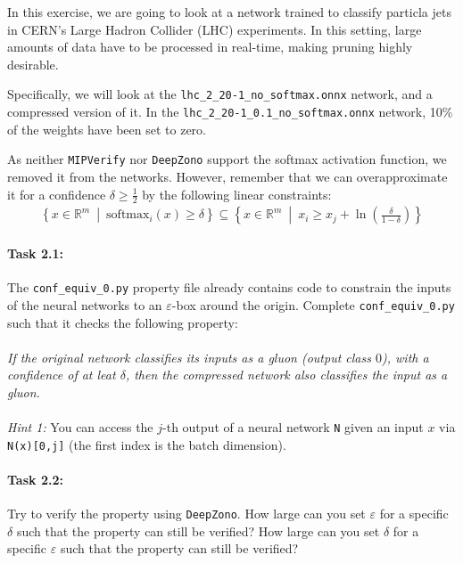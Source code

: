 \documentclass[11pt,fleqn]{article}
\begin{document}
In this exercise, we are going to look at a network trained to classify particla jets in CERN's 
Large Hadron Collider (LHC) experiments.
In this setting, large amounts of data have to be processed in real-time, making pruning highly desirable.

Specifically, we will look at the \texttt{lhc\_2\_20-1\_no\_softmax.onnx} network, and a compressed version of it.
In the \texttt{lhc\_2\_20-1\_0.1\_no\_softmax.onnx} network, 10\% of the weights have been set to zero.

As neither \texttt{MIPVerify} nor \texttt{DeepZono} support the softmax activation function, we removed it from the networks.
However, remember that we can overapproximate it for a confidence $\delta \geq \frac{1}{2}$ by the following linear constraints: 
\begin{align*}
    \left\{
        x \in \mathbb{R}^m~\middle|~
        \mathrm{softmax}_i\left(x\right) \geq \delta
    \right\}
\subseteq
\left\{
x \in \mathbb{R}^m~\middle|~
x_i \geq x_j + \ln\left(\frac{\delta}{1-\delta}\right)
\right\}
\end{align*}

\paragraph{Task 2.1:}
The \texttt{conf\_equiv\_0.py} property file already contains code to constrain the inputs of the neural 
networks to an $\varepsilon$-box around the origin.
Complete \texttt{conf\_equiv\_0.py} such that it checks the following property:
\\
\\
\emph{If the original network classifies its inputs as a gluon (output class $0$), with a confidence of at leat $\delta$, 
then the compressed network also classifies the input as a gluon.}
\\
\\
\textit{Hint 1:} 
You can access the $j$-th output of a neural network \texttt{N} given an input $x$ via \texttt{N(x)[0,j]} (the first index is the batch dimension).

\paragraph{Task 2.2:}
Try to verify the property using \texttt{DeepZono}.
How large can you set $\varepsilon$ for a specific $\delta$ such that the property can still be verified?
How large can you set $\delta$ for a specific $\varepsilon$ such that the property can still be verified?
\end{document}
